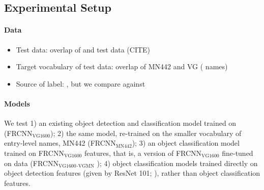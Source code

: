 \subsection{Experimental Setup}
\label{sect:exp_setup}

\paragraph{Data}
\begin{itemize}
	\item Test data: overlap of \mn and \vg test data (CITE)
	\item Target vocabulary of test data: overlap of MN442 and VG ( names)
	\item Source of label: \mn, but we compare against \vg
\end{itemize}

\paragraph{Models}

We test 1) an existing object detection and classification model trained on \vg (FRCNN$_{\text{VG1600}}$); 2) the same model, re-trained on the smaller vocabulary of entry-level names, MN442 (FRCNN$_{\text{MN442}}$); 3) an object classification model trained on FRCNN$_{\text{VG1600}}$ features, that is, a version of FRCNN$_{\text{VG1600}}$ fine-tuned on \mn data (FRCNN$_{\text{VG1600}}$$_{\text{-VGMN}}$ ); 4) object classification models trained directly on object detection features (given by ResNet 101; \cite{}), rather than object classification features.

